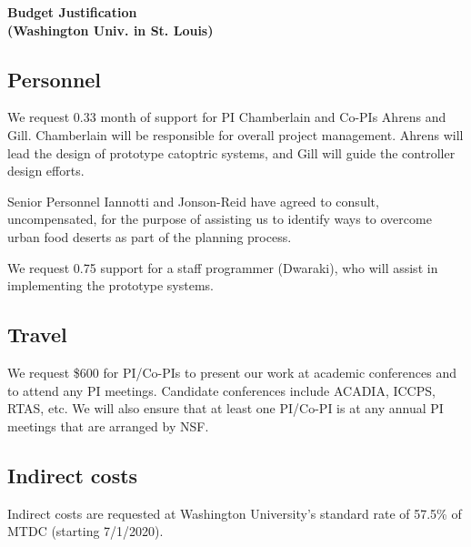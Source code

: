 \documentclass[11pt]{article}
\begin{document}
\pagestyle{empty}
\thispagestyle{empty}

\begin{center}
\textbf{\Large Budget Justification\\(Washington Univ. in St. Louis)}
\end{center}

\subsection*{Personnel}
We request 0.33 month of support for PI Chamberlain and Co-PIs
Ahrens and Gill.
Chamberlain will be responsible for overall project management. Ahrens will
lead the design of prototype catoptric systems, and Gill will guide the
controller design efforts.

\vspace{0.2in}
\noindent
Senior Personnel Iannotti and Jonson-Reid have agreed to consult,
uncompensated, for the purpose of assisting us to identify ways to overcome
urban food deserts as part of the planning process.

\vspace{0.2in}
\noindent
We request 0.75 support for a staff programmer (Dwaraki), who will assist
in implementing the prototype systems.

\subsection*{Travel}
We request \$600 for PI/Co-PIs
to present our work at academic 
conferences and to attend any PI meetings.
Candidate conferences include ACADIA, ICCPS, RTAS, etc.
We will also ensure that at least one PI/Co-PI is
at any annual PI meetings that are arranged by NSF. 

\subsection*{Indirect costs}
Indirect costs are requested at Washington University's standard rate of
57.5\% of MTDC (starting 7/1/2020).
\end{document}
